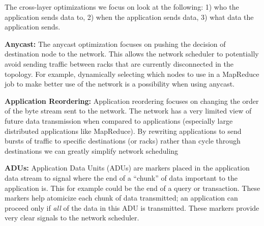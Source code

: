 The cross-layer optimizations we focus on look at the following: 1) who the
application sends data to, 2) when the application sends data, 3) what data the
application sends.

{\bf Anycast:} The anycast optimization focuses on pushing the decision of
destination node to the network. This allows the network scheduler to
potentially avoid sending traffic between racks that are currently disconnected
in the topology. For example, dynamically selecting which nodes to use in a
MapReduce job to make better use of the network is a possibility when using
anycast. 

{\bf Application Reordering:} Application reordering focuses on changing the
order of the byte stream sent to the network. The network has a very limited
view of future data transmission when compared to applications (especially large
distributed applications like MapReduce). By rewriting applications to send
bursts of traffic to specific destinations (or racks) rather than cycle through
destinations we can greatly simplify network scheduling 

{\bf ADUs:} Application Data Units (ADUs) are markers placed in the application
data stream to signal where the end of a ``chunk'' of data important to the
application is. This for example could be the end of a query or
transaction. These markers help atomicize each chunk of data transmitted; an
application can proceed only if \emph{all} of the data in this ADU is
transmitted. These markers provide very clear signals to the network
scheduler. 
